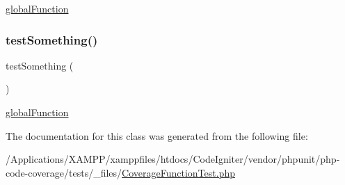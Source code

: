 \mbox{\hyperlink{phpunit_2tests_2__files_2_covered_function_8php_a321be2fcdead5148a9cc7794f56f08ad}{global\+Function}} \mbox{\label{class_coverage_function_test_a0fc4e17369bc9607ebdd850d9eda8167}} 
\subsubsection{\texorpdfstring{test\+Something()}{testSomething()}\hspace{0.1cm}{\footnotesize\ttfamily [2/2]}}
{\footnotesize\ttfamily test\+Something (\begin{DoxyParamCaption}{ }\end{DoxyParamCaption})}

\mbox{\hyperlink{phpunit_2tests_2__files_2_covered_function_8php_a321be2fcdead5148a9cc7794f56f08ad}{global\+Function}} 

The documentation for this class was generated from the following file\+:\begin{DoxyCompactItemize}
\item 
/\+Applications/\+X\+A\+M\+P\+P/xamppfiles/htdocs/\+Code\+Igniter/vendor/phpunit/php-\/code-\/coverage/tests/\+\_\+files/\mbox{\hyperlink{php-code-coverage_2tests_2__files_2_coverage_function_test_8php}{Coverage\+Function\+Test.\+php}}\end{DoxyCompactItemize}
